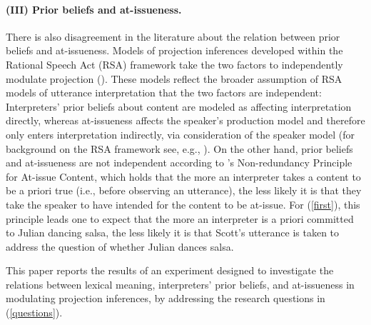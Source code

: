 \documentclass[11pt,fleqn]{article}
\newcommand{\6}{\mbox{$[\hspace*{-.6mm}[$}}
\newcommand{\9}{\mbox{$]\hspace*{-.6mm}]$}}
\newcommand{\citepos}[1]{\citeauthor{#1}'s \citeyear{#1}}
\begin{document}
\paragraph{(III) Prior beliefs and at-issueness.} There is also disagreement in the literature about the relation between prior beliefs and at-issueness. Models of projection inferences developed within the Rational Speech Act (RSA) framework take the two factors to independently modulate projection (\citealt*{qing-etal2016,stevens-etal2017,warstadt2022,pan-degen2023}). These models reflect the broader assumption of RSA models of utterance interpretation that the two factors are independent: Interpreters' prior beliefs about content are modeled as affecting interpretation directly, whereas at-issueness affects the speaker's production model and therefore only enters interpretation indirectly, via consideration of the speaker model (for background on the RSA framework see, e.g., \citealt{degen2023-RSA}). On the other hand, prior beliefs and at-issueness are not independent according to \citepos{tonhauser-etal-eval} Non-redundancy Principle for At-issue Content, which holds that the more an interpreter takes a content to be a priori true (i.e., before observing an utterance), the less likely it is that they take the speaker to have intended for the content to be at-issue.  For (\ref{first}), this principle leads one to expect that the more an interpreter is a priori committed to Julian dancing salsa, the less likely it is that Scott's utterance is taken to address the question of whether Julian dances salsa. 



\medskip

This paper reports the results of an experiment designed to investigate the relations between lexical meaning, interpreters' prior beliefs, and at-issueness in modulating projection inferences, by addressing the research questions in (\ref{questions}). 
\end{document}
